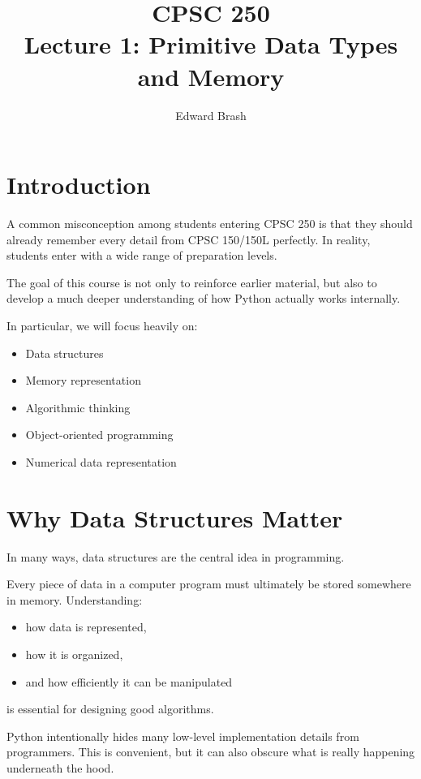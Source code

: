 \documentclass[11pt]{article}
\title{CPSC 250 \\ Lecture 1: Primitive Data Types and Memory}
\author{Edward Brash}
\date{}
\begin{document}
\maketitle

\section{Introduction}

A common misconception among students entering CPSC 250 is that they should already remember every detail from CPSC 150/150L perfectly. In reality, students enter with a wide range of preparation levels.

The goal of this course is not only to reinforce earlier material, but also to develop a much deeper understanding of how Python actually works internally.

In particular, we will focus heavily on:

\begin{itemize}
    \item Data structures
    \item Memory representation
    \item Algorithmic thinking
    \item Object-oriented programming
    \item Numerical data representation
\end{itemize}

\section{Why Data Structures Matter}

In many ways, data structures are the central idea in programming.

Every piece of data in a computer program must ultimately be stored somewhere in memory. Understanding:

\begin{itemize}
    \item how data is represented,
    \item how it is organized,
    \item and how efficiently it can be manipulated
\end{itemize}

is essential for designing good algorithms.

Python intentionally hides many low-level implementation details from programmers. This is convenient, but it can also obscure what is really happening underneath the hood.
\end{document}
